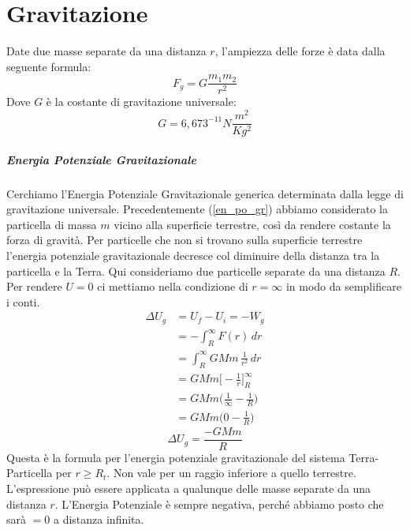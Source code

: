 \chapter{Gravitazione}

Date due masse separate da una distanza $r$, l'ampiezza delle forze è data 
dalla seguente formula:
\begin{equation}
    F_g = G\frac{m_1m_2}{r^2}
\end{equation}
Dove $G$ è la costante di gravitazione universale:
\begin{equation*}
    G = 6,673^{-11} N\frac{m^2}{Kg^2}
\end{equation*}
    
    \paragraph{Energia Potenziale Gravitazionale} Cerchiamo l'Energia 
    Potenziale Gravitazionale generica determinata dalla legge di gravitazione 
    universale. Precedentemente (\ref{en_po_gr}) abbiamo considerato la 
    particella di massa $m$ vicino alla superficie terrestre, così da rendere 
    costante la forza di gravità. Per particelle che non si trovano sulla 
    superficie terrestre l'energia potenziale gravitazionale decresce col 
    diminuire della distanza tra la particella e la Terra. Qui consideriamo 
    due particelle separate da una distanza $R$. Per rendere $U = 0$ ci 
    mettiamo nella condizione di $ r = \infty$ in modo da semplificare i conti.
    \begin{align*}
        \Delta U_g &= U_f - U_i = -W_g \\
        &= - \int_{R}^{\infty} F(r) \,dr \\
        &= \int_{R}^{\infty} GMm \, \frac{1}{r^2} \,dr \\
        &= GMm \bigg[-\frac{1}{r}\bigg]^{\infty}_{R} \\
        &= GMm\biggl(\frac{1}{\infty} - \frac{1}{R}\biggr) \\
        &= GMm\biggl(0 - \frac{1}{R}\biggr)
    \end{align*}
    \begin{equation}
        \Delta U_g = \frac{-GMm}{R}
    \end{equation}
    Questa è la formula per l'energia potenziale gravitazionale del sistema
    Terra-Particella per $r \geq R_t$. Non vale per un raggio inferiore a
    quello terrestre.
    L'espressione può essere applicata a qualunque delle masse separate da una
    distanza $r$. L'Energia Potenziale è sempre negativa, perché abbiamo posto
    che sarà $= 0$ a distanza infinita.